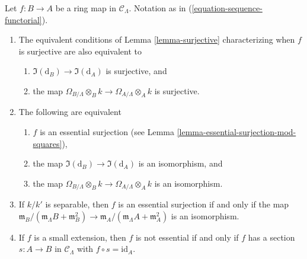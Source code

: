 \begin{lemma}
\label{lemma-essential-surjection}
Let $f: B \to A$ be a ring map in $\mathcal{C}_\Lambda$.
Notation as in (\ref{equation-sequence-functorial}).
\begin{enumerate}
\item The equivalent conditions of
Lemma \ref{lemma-surjective}
characterizing when $f$ is surjective are also equivalent to
\begin{enumerate}
\item $\Im(\text{d}_B) \to \Im(\text{d}_A)$ is surjective, and
\item the map $\Omega_{B/\Lambda} \otimes_B k \to
\Omega_{A/\Lambda} \otimes_A k$ is surjective.
\end{enumerate}
\item The following are equivalent
\begin{enumerate}
\item $f$ is an essential surjection
(see Lemma \ref{lemma-essential-surjection-mod-squares}),
\item the map $\Im(\text{d}_B) \to \Im(\text{d}_A)$ is an
isomorphism, and
\item the map $\Omega_{B/\Lambda} \otimes_B k \to
\Omega_{A/\Lambda} \otimes_A k$ is an isomorphism.
\end{enumerate}
\item If $k/k'$ is separable, then $f$ is an essential surjection if
and only if the map
$\mathfrak m_B/(\mathfrak m_\Lambda B + \mathfrak m_B^2) \to
\mathfrak m_A/(\mathfrak m_\Lambda A + \mathfrak m_A^2)$
is an isomorphism.
\item If $f$ is a small extension, then $f$ is not essential if and only if
$f$ has a section $s: A \to B$ in $\mathcal{C}_\Lambda$
with $f \circ s = \text{id}_A$.
\end{enumerate}
\end{lemma}

